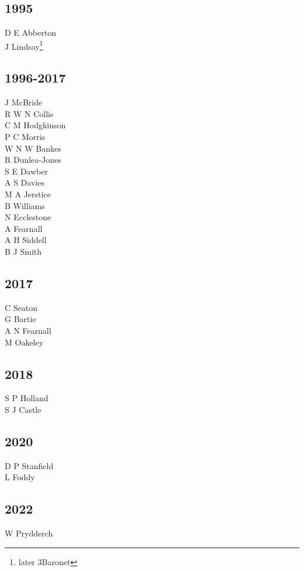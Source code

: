 \begin{multicols}{3}
  \subsection*{1995}
  D E Abberton \\
  J Lindsay\footnote{later 3\rd Baronet} \\
  \subsection*{1996-2017}
  J McBride \\
  R W N Collis \\
  C M Hodgkinson \\
  P C Morris \\
  W N W Bankes \\
  R Dunlea-Jones \\
  S E Dawber \\
  A S Davies \\
  M A Jerstice \\
  B Williams \\
  N Ecclestone \\
  A Fearnall \\
  A H Siddell \\
  B J Smith \\
  \subsection*{2017}
  C Seaton \\
  G Bartie \\
  A N Fearnall \\
  M Oakeley \\
  \subsection*{2018}
  S P Holland \\
  S J Castle \\
  \subsection*{2020}
  D P Stanfield \\
  L Foddy \\
  \subsection*{2022}
  W Prydderch \\

\end{multicols}
